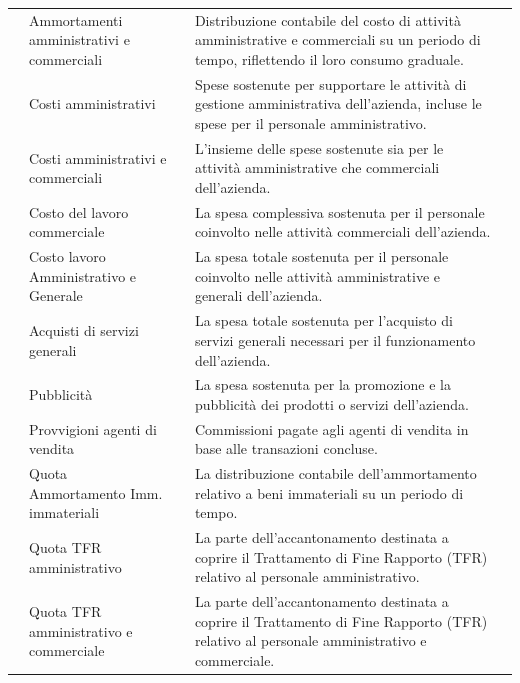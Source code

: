 \documentclass{article}
\newcommand{\AmmortamentiAmministrativiCommerciati}{Distribuzione contabile del costo di attività amministrative e commerciali su un periodo di tempo, riflettendo il loro consumo graduale.}
\newcommand{\CostiAmministrativi}{Spese sostenute per supportare le attività di gestione amministrativa dell'azienda, incluse le spese per il personale amministrativo.}
\newcommand{\CostiAmministrativiCommerciali}{L'insieme delle spese sostenute sia per le attività amministrative che commerciali dell'azienda.}
\newcommand{\CostoLavoroCommerciale}{La spesa complessiva sostenuta per il personale coinvolto nelle attività commerciali dell'azienda.}
\newcommand{\CostoLavoroAmministrativoGenerale}{La spesa totale sostenuta per il personale coinvolto nelle attività amministrative e generali dell'azienda.}
\newcommand{\AcquistiServiziGenerali}{La spesa totale sostenuta per l'acquisto di servizi generali necessari per il funzionamento dell'azienda.}
\newcommand{\Pubblicita}{La spesa sostenuta per la promozione e la pubblicità dei prodotti o servizi dell'azienda.}
\newcommand{\ProvvigioniAgentiVendita}{Commissioni pagate agli agenti di vendita in base alle transazioni concluse.}
\newcommand{\QuotaAmmortamentoImmImmateriali}{La distribuzione contabile dell'ammortamento relativo a beni immateriali su un periodo di tempo.}
\newcommand{\QuotaTFRAmministrativo}{La parte dell'accantonamento destinata a coprire il Trattamento di Fine Rapporto (TFR) relativo al personale amministrativo.}
\newcommand{\QuotaTFRAmministrativoCommerciale}{La parte dell'accantonamento destinata a coprire il Trattamento di Fine Rapporto (TFR) relativo al personale amministrativo e commerciale.}
\begin{document}
\begin{table}[ht]
{\begin{tabular}{|c l|c|l|c|}
                           & Ammortamenti amministrativi e commerciali                               &                    & \AmmortamentiAmministrativiCommerciati                      &           \\
                           & Costi amministrativi                                                    &                    & \CostiAmministrativi                                        &           \\
                           & Costi amministrativi e commerciali                                      &                    & \CostiAmministrativiCommerciali                             &           \\
                           & Costo del lavoro commerciale                                            &                    & \CostoLavoroCommerciale                                     &           \\
                           & Costo lavoro Amministrativo e Generale                                  &                    & \CostoLavoroAmministrativoGenerale                          &           \\
                           & Acquisti di servizi generali                                            &                    & \AcquistiServiziGenerali                                    &           \\
                           & Pubblicità                                                              &                    & \Pubblicita                                                 &           \\
                           & Provvigioni agenti di vendita                                           &                    & \ProvvigioniAgentiVendita                                   &           \\
                           & Quota Ammortamento Imm. immateriali                                     &                    & \QuotaAmmortamentoImmImmateriali                            &           \\
                           & Quota TFR amministrativo                                                &                    & \QuotaTFRAmministrativo                                     &           \\
                           & Quota TFR amministrativo e commerciale                                  &                    & \QuotaTFRAmministrativoCommerciale                          &           \\

\end{tabular}}
\end{table}
\end{document}
